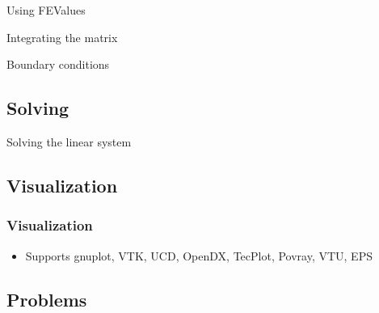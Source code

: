 \begin{frame}
  \begin{block}{Using FEValues}
  
  \end{block}
\end{frame}

\begin{frame}
  \begin{block}{Integrating the matrix}
  
  \end{block}
\end{frame}

\begin{frame}
  \begin{block}{Boundary conditions}
  
  \end{block}
\end{frame}

\subsection{Solving}
\begin{frame}
  \begin{block}{Solving the linear system}
  
  \end{block}
\end{frame}

\subsection{Visualization}
\begin{frame}
  \frametitle{Visualization}
  \begin{block}{}
    
  \end{block}
  \begin{itemize}
  \item Supports gnuplot, VTK, UCD, OpenDX, TecPlot, Povray, VTU, EPS
  \end{itemize}
\end{frame}

\subsection{Problems}


